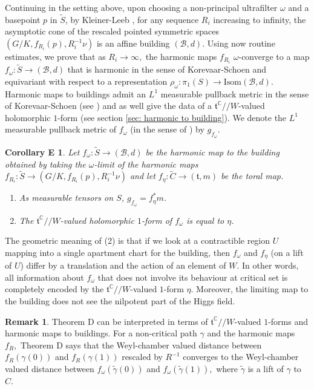 \documentclass[10pt]{amsart}
\newcommand{\ft}{\mathfrak{t}}
\newtheorem*{core}{Corollary E}
\theoremstyle{definition}
\newtheorem{remark}[thm]{Remark}
\DeclareMathOperator{\C}{\mathbb{C}}
\begin{document}
Continuing in the setting above, upon choosing a non-principal ultrafilter $\omega$ and a basepoint $p$ in $\tilde{S}$, by Kleiner-Leeb \cite{KL}, for any sequence $R_i$ increasing to infinity, the asymptotic cone of the rescaled pointed symmetric spaces $(G/K,f_{R_i}(p),R_i^{-1}\nu)$ is an affine building $(\mathcal{B},d)$. Using now routine estimates, we prove that as $R_i\to \infty,$ the harmonic maps $f_{R_i}$ $\omega$-converge to a map $f_\omega:\tilde{S}\to (\mathcal{B},d)$ that is harmonic in the sense of Korevaar-Schoen \cite{KS} and equivariant with respect to a representation $\rho_\omega:\pi_1(S)\to \textrm{Isom}(\mathcal{B},d)$. Harmonic maps to buildings admit an $L^1$ measurable pullback metric in the sense of Korevaar-Schoen (see \cite{KS}) and as well give the data of a $\ft^{\C}//W$-valued holomorphic $1$-form (see section \ref{sec: harmonic to building}). We denote the $L^1$ measurable pullback metric of $f_\omega$ (in the sense of \cite{KS}) by $g_{f_\omega}$.
\begin{core}
Let $f_\omega: \tilde{S}\to (\mathcal{B},d)$ be the harmonic map to the building obtained by taking the $\omega$-limit of the harmonic maps $f_{R_i}:\tilde{S}\to (G/K,f_{R_i}(p),R_i^{-1}\nu)$ and let $f_\eta:\tilde{C}\to (\ft,m)$ be the toral map.
\begin{enumerate}
\item As measurable tensors on $S$, $g_{f_\omega}=f_\eta^*m$.
    \item The $\ft^{\C}//W$-valued holomorphic $1$-form of $f_\omega$ is equal to $\eta$.
\end{enumerate}
\end{core}
The geometric meaning of (2) is that if we look at a contractible region $U$ mapping into a single apartment chart for the building, then $f_\omega$ and $f_\eta$ (on a lift of $U$) differ by a translation and the action of an element of $W$.
In other words, all information about $f_\omega$ that does not involve its behaviour at critical set is completely encoded by the $\ft^{\C}//W$-valued $1$-form $\eta$. Moreover, the limiting map to the building does not see the nilpotent part of the Higgs field. 
\begin{remark}
    Theorem D can be interpreted in terms of $\ft^{\C}//W$-valued $1$-forms and harmonic maps to buildings. For a non-critical path $\gamma$ and the harmonic maps $f_R,$ Theorem D says that the Weyl-chamber valued distance between $f_R(\gamma(0))$ and $f_R(\gamma(1))$ rescaled by $R^{-1}$ converges to the Weyl-chamber valued distance between $f_\omega(\tilde{\gamma}(0))$ and $f_\omega(\tilde{\gamma}(1)),$ where $\tilde{\gamma}$ is a lift of $\gamma$ to $C$.
\end{remark}
\end{document}
